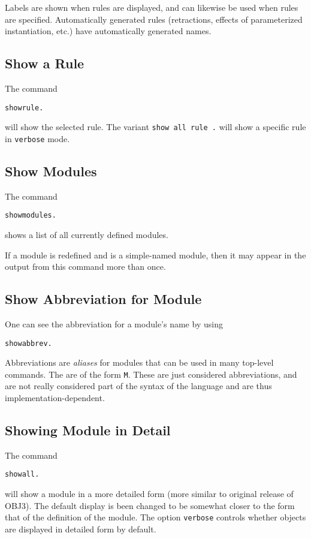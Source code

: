 Labels are shown when rules are displayed, and can likewise be used
when rules are specified.  Automatically generated rules (retractions,
effects of parameterized instantiation, etc.) have automatically
generated names.

\subsection{Show a Rule}
The command
\begin{alltt}
        show rule  .
\end{alltt}
will show the selected rule.  The variant {\tt show all rule
   .} will show a specific rule in {\tt verbose} mode.

\subsection{Show Modules}
The command
\begin{alltt}
        show modules .
\end{alltt}
shows a list of all currently defined modules.

If a module is redefined and is a simple-named module, then it may
appear in the output from this command more than once.

\subsection{Show Abbreviation for Module}
One can see the abbreviation for a module's name by using
\begin{alltt}
        show abbrev \lopt {}  \ropt .
\end{alltt}
Abbreviations are {\em aliases} for modules that can be used in many
top-level commands.  The are of the form {\tt M}.  These
are just considered abbreviations, and are not really considered part
of the syntax of the language and are thus implementation-dependent.

\subsection {Showing Module in Detail}
The command
\begin{alltt}
        show all \lopt {} \ropt .
\end{alltt}
will show a module in a more detailed form (more similar to original
release of OBJ3).  The default display is been changed to be somewhat
closer to the form that of the definition of the module.  The option
{\tt verbose} controls whether objects are displayed in detailed form
by default.

